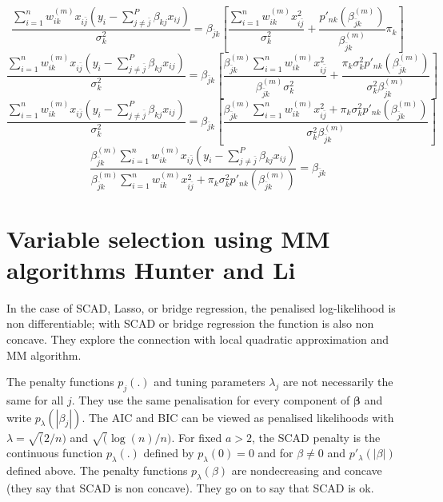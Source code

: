 \documentclass{article}
\newcommand{\bbeta}{{\boldsymbol \beta}}                        %
\begin{document}
    $$ \frac{\sum_{i=1}^nw_{ik}^{(m)} x_{i{\bar j}}(y_i - 
         \sum_{j\neq{\bar j}}^P\beta_{kj}x_{ij})} {\sigma^2_k} = 
         \beta_{{\bar j}k}\left[ \frac{\sum_{i=1}^nw_{ik}^{(m)}x^2_{i{\bar j}}}    
        {\sigma^2_k}  + \frac{ p'_{nk}(\beta^{(m)}_{{\bar j}k}) } { \beta_{{\bar j}k}^{(m)} }\pi_k \right ]$$
    $$ \frac{\sum_{i=1}^nw_{ik}^{(m)} x_{i{\bar j}}(y_i - 
         \sum_{j\neq{\bar j}}^P\beta_{kj}x_{ij})} {\sigma^2_k} = 
         \beta_{{\bar j}k}\left[  \frac{\beta_{{\bar j}k}^{(m)}\sum_{i=1}^nw_{ik}^{(m)}x^2_{i{\bar j}}}    
        { \beta_{{\bar j}k}^{(m)}\sigma^2_k}  
        + \frac{ \pi_k\sigma^2_kp'_{nk}(\beta^{(m)}_{{\bar j}k}) } {\sigma^2_k\beta_{{\bar j}k}^{(m)} } \right ]$$
    $$ \frac{\sum_{i=1}^nw_{ik}^{(m)} x_{i{\bar j}}(y_i - 
         \sum_{j\neq{\bar j}}^P\beta_{kj}x_{ij})} {\sigma^2_k} = 
         \beta_{{\bar j}k}\left[  \frac{\beta_{{\bar j}k}^{(m)}\sum_{i=1}^nw_{ik}^{(m)}x^2_{i{\bar j}} + \pi_k      
         \sigma^2_kp'_{nk}(\beta^{(m)}_{{\bar j}k}) } {\sigma^2_k\beta_{{\bar j}k}^{(m)} } \right ]$$
    $$ \frac{\beta_{{\bar j}k}^{(m)}\sum_{i=1}^nw_{ik}^{(m)} x_{i{\bar j}}(y_i - 
         \sum_{j\neq{\bar j}}^P\beta_{kj}x_{ij})} {\beta_{{\bar j}k}^{(m)}\sum_{i=1}^nw_{ik}^{(m)}x^2_{i{\bar j}} + \pi_k      
         \sigma^2_kp'_{nk}(\beta^{(m)}_{{\bar j}k})} = 
         \beta_{{\bar j}k} $$
    
\section{Variable selection using MM algorithms Hunter and Li}

In the case of SCAD, Lasso, or bridge regression, the penalised log-likelihood is non differentiable; with SCAD or bridge regression the function is also non concave. They explore the connection with local quadratic approximation and MM algorithm.

The penalty functions $p_j(.)$ and tuning parameters $\lambda_j$ are not necessarily the same for all $j$. They use the same penalisation for every component of $\bbeta$ and write $p_{\lambda}(|\beta_j|)$. The AIC and BIC can be viewed as penalised likelihoods with $\lambda = \sqrt(2/n)$ and $\sqrt(\log(n)/n)$. For fixed $a>2$, the SCAD penalty is the continuous function $p_{\lambda}(.)$ defined by  $p_{\lambda}(0) = 0$ and for $\beta \neq 0$ and $p'_{\lambda}(|\beta|)$ defined above. The penalty functions $p_{\lambda}(\beta)$ are nondecreasing and concave (they say that SCAD is non concave). They go on to say that SCAD is ok. 
\end{document}
